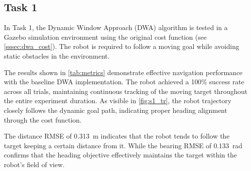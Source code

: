 \subsection{Task 1}


In Task 1, the Dynamic Window Approach (DWA) algorithm is tested in a Gazebo simulation environment using the original cost function (see \autoref{sssec:dwa_cost}). The robot is required to follow a moving goal while avoiding static obstacles in the environment.


The results shown in \autoref{tab:metrics} demonstrate effective navigation performance with the baseline DWA implementation. The robot achieved a 100\% success rate across all trials, maintaining continuous tracking of the moving target throughout the entire experiment duration. As visible in \autoref{fig:s1_tr}, the robot trajectory closely follows the dynamic goal path, indicating proper heading alignment through the cost function.

The distance RMSE of 0.313~m indicates that the robot tends to follow the target keeping a certain distance from it. While the bearing RMSE of 0.133~rad confirms that the heading objective effectively maintains the target within the robot's field of view. 

